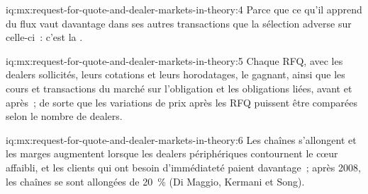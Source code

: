 \begin{solution}{iq:mx:request-for-quote-and-dealer-markets-in-theory:4}
Parce que ce qu'il apprend du flux vaut davantage dans ses autres transactions que la sélection adverse sur celle-ci~: c'est la .
\end{solution}

\begin{solution}{iq:mx:request-for-quote-and-dealer-markets-in-theory:5}
Chaque RFQ, avec les dealers sollicités, leurs cotations et leurs horodatages, le gagnant, ainsi que les cours et transactions du marché sur l'obligation et les obligations liées, avant et
après~; de sorte que les variations de prix après les RFQ puissent être comparées selon le nombre de dealers.
\end{solution}

\begin{solution}{iq:mx:request-for-quote-and-dealer-markets-in-theory:6}
Les chaînes s'allongent et les marges augmentent lorsque les dealers périphériques contournent le cœur affaibli, et les clients qui ont besoin d'immédiateté paient davantage~; après 2008, les chaînes
se sont allongées de 20~\% (Di Maggio, Kermani et Song).
\end{solution}
